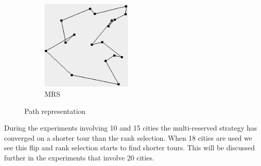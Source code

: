 \documentclass[10pt,a4paper,openbib]{article}
\begin{document}
\begin{multicols}{2}
\begin{figure}[H]
\begin{center}
\begin{subfigure}[b]{0.23\textwidth}
        \includegraphics[width=0.48\textwidth]{images/result3/Pathtrue4.png}
        \caption{MRS}
        \label{fig:cities18GraphPathtrue}
    \end{subfigure}  
    \caption{Path representation}
    \label{fig:cities18GraphPath}
\end{center}
\end{figure}

\noindent During the experiments involving 10 and 15 cities the multi-reserved strategy has converged on a shorter tour than the rank selection. When 18 cities are used we see this flip and rank selection starts to find shorter tours. This will be discussed further in the experiments that involve 20 cities. \\



\end{multicols}
\end{document}
